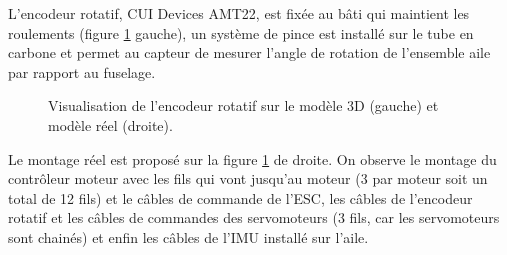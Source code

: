 {    L'encodeur rotatif, CUI Devices AMT22, est fixée au bâti qui maintient les roulements (figure \ref{fig:ColibriRotReel} gauche), un système de pince est installé sur le tube en carbone et permet au capteur de mesurer l'angle de rotation de l'ensemble aile par rapport au fuselage.

    \begin{figure}[ht!]
        \centering
        \caption{Visualisation de l'encodeur rotatif sur le modèle 3D (gauche) et modèle réel (droite).}
        \label{fig:ColibriRotReel}
    \end{figure}
    Le montage réel est proposé sur la figure \ref{fig:ColibriRotReel} de droite. On observe le montage du contrôleur moteur avec les fils qui vont jusqu'au moteur (3 par moteur soit un total de 12 fils) et le câbles de commande de l'ESC, les câbles de l'encodeur rotatif et les câbles de commandes des servomoteurs (3 fils, car les servomoteurs sont chainés) et enfin les câbles de l'IMU installé sur l'aile.
}

